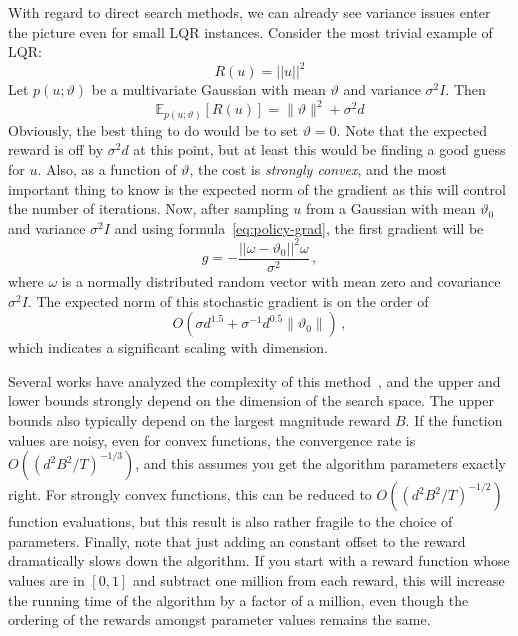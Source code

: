 \documentclass[11pt]{article}
\newcommand{\eqd}[1]{\eqref{eq:#1}}
\numberwithin{equation}{section}
\begin{document}
With regard to direct search methods, we can already see variance issues enter the picture even for small LQR instances. Consider the most trivial example of LQR:
\begin{equation*}
	R(u) = ||u||^2
\end{equation*}
Let $p(u;\vartheta)$ be a multivariate Gaussian with mean $\vartheta$ and variance $\sigma^2 I$.  Then
\begin{equation*}
	\mathbb{E}_{p(u;\vartheta)} [R(u)]= \|\vartheta\|^2 + \sigma^2 d
\end{equation*}
Obviously, the best thing to do would be to set $\vartheta=0$. Note that the expected reward is off by $\sigma^2 d$ at this point, but at least this would be finding a good guess for $u$.  Also, as a function of $\vartheta$, the cost is \emph{strongly convex}, and the most important thing to know is the expected norm of the gradient as this will control the number of iterations. Now, after sampling $u$ from a Gaussian with mean $\vartheta_0$ and variance $\sigma^2 I$ and using formula~\eqd{policy-grad}, the first gradient will be  
\begin{equation*}
	g=-\frac{||\omega-\vartheta_0||^2 \omega}{\sigma^2}\,,
\end{equation*}
where $\omega$ is a normally distributed random vector with mean zero and covariance $\sigma^2 I$.
The expected norm of this stochastic gradient is on the order of
\begin{equation*}
O\left(\sigma d^{1.5} + \sigma^{-1} d^{0.5} \|\vartheta_0\|\right)\,,
\end{equation*}
which indicates a significant scaling with dimension.

Several works  have analyzed the complexity of this method~\cite{flaxman2005online,agarwal2010optimal,Jamieson12}, and the upper and lower bounds strongly depend on the dimension of the search space. The upper bounds also typically depend on the largest magnitude reward $B$.  If the function values are noisy, even for convex functions, the convergence rate is $O((d^2B^2/T)^{-1/3})$, and this assumes you get the algorithm parameters exactly right. For strongly convex functions, this can be reduced to $O((d^2B^2/T)^{-1/2})$ function evaluations, but this result is also rather fragile to the choice of parameters. Finally, note that just adding an constant offset to the reward dramatically slows down the algorithm. If you start with a reward function whose values are in $[0,1]$ and subtract one million from each reward, this will increase the running time of the algorithm by a factor of a million, even though the ordering of the rewards amongst parameter values remains the same.
\end{document}

